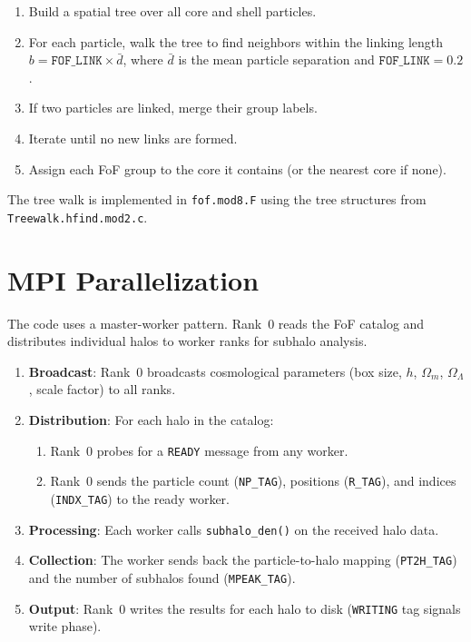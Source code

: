 \documentclass[11pt,fleqn]{book}
\newcommand{\code}[1]{\texttt{#1}}
\newcommand{\file}[1]{\texttt{#1}}
\begin{document}
\begin{algorithm}
\begin{enumerate}[leftmargin=2em]
  \item Build a spatial tree over all core and shell particles.
  \item For each particle, walk the tree to find neighbors within the linking length $b = \code{FOF\_LINK} \times \bar{d}$, where $\bar{d}$ is the mean particle separation and $\code{FOF\_LINK} = 0.2$.
  \item If two particles are linked, merge their group labels.
  \item Iterate until no new links are formed.
  \item Assign each FoF group to the core it contains (or the nearest core if none).
\end{enumerate}
The tree walk is implemented in \file{fof.mod8.F} using the tree structures from \file{Treewalk.hfind.mod2.c}.
\end{algorithm}

\section{MPI Parallelization}

The code uses a master-worker pattern.  Rank~0 reads the FoF catalog and distributes individual halos to worker ranks for subhalo analysis.

\begin{algorithm}
\begin{enumerate}[leftmargin=2em]
  \item \textbf{Broadcast}: Rank~0 broadcasts cosmological parameters (box size, $h$, $\Omega_m$, $\Omega_\Lambda$, scale factor) to all ranks.
  \item \textbf{Distribution}: For each halo in the catalog:
    \begin{enumerate}
      \item Rank~0 probes for a \code{READY} message from any worker.
      \item Rank~0 sends the particle count (\code{NP\_TAG}), positions (\code{R\_TAG}), and indices (\code{INDX\_TAG}) to the ready worker.
    \end{enumerate}
  \item \textbf{Processing}: Each worker calls \code{subhalo\_den()} on the received halo data.
  \item \textbf{Collection}: The worker sends back the particle-to-halo mapping (\code{PT2H\_TAG}) and the number of subhalos found (\code{MPEAK\_TAG}).
  \item \textbf{Output}: Rank~0 writes the results for each halo to disk (\code{WRITING} tag signals write phase).
\end{enumerate}
\end{algorithm}
\end{document}
